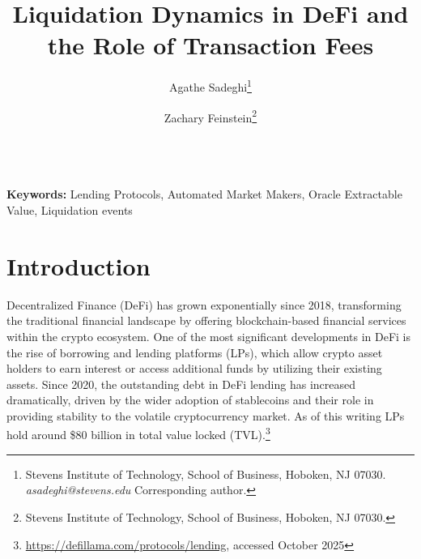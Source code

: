 \documentclass[11pt]{article} %
\begin{document}
\title{Liquidation Dynamics in DeFi and the Role of Transaction Fees}
\author{Agathe Sadeghi\thanks{Stevens Institute of Technology, School of Business, Hoboken, NJ 07030. \textit{asadeghi@stevens.edu} Corresponding author.} \and Zachary Feinstein\thanks{Stevens Institute of Technology, School of Business, Hoboken, NJ 07030.}}
\date{}
\maketitle
{}\\
\noindent\textbf{Keywords:} Lending Protocols, Automated Market Makers, Oracle Extractable Value, Liquidation events

\newpage
\section{Introduction}\label{sec:intro}
Decentralized Finance (DeFi) has grown exponentially since 2018, transforming the traditional financial landscape by offering blockchain-based financial services within the crypto ecosystem. One of the most significant developments in DeFi is the rise of borrowing and lending platforms (LPs), which allow crypto asset holders to earn interest or access additional funds by utilizing their existing assets. Since 2020, the outstanding debt in DeFi lending has increased dramatically, driven by the wider adoption of stablecoins and their role in providing stability to the volatile cryptocurrency market. As of this writing LPs hold around \$80 billion in total value locked (TVL).\footnote{\url{https://defillama.com/protocols/lending}, accessed October 2025}
\end{document}
